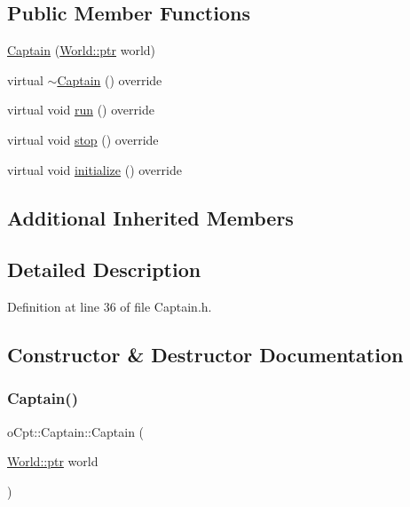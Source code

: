 \subsection*{Public Member Functions}
\begin{DoxyCompactItemize}
\item 
\hyperlink{classo_cpt_1_1_captain_a36f8b64ff252791b2d28bdb10a9652c7}{Captain} (\hyperlink{classo_cpt_1_1_world_aa6e591e3096d5de71e0cec9039663d67}{World\+::ptr} world)
\item 
virtual \hyperlink{classo_cpt_1_1_captain_ae78194ab847c6fbf3fae7f3d92f02f70}{$\sim$\+Captain} () override
\item 
virtual void \hyperlink{classo_cpt_1_1_captain_ade0ca7804340b555a9ead5dd01465045}{run} () override
\item 
virtual void \hyperlink{classo_cpt_1_1_captain_aa8a3923b961f4bc2ebc857895f759711}{stop} () override
\item 
virtual void \hyperlink{classo_cpt_1_1_captain_a3afce8b5a16b91a8b848ab6ae12a5ca6}{initialize} () override
\end{DoxyCompactItemize}
\subsection*{Additional Inherited Members}


\subsection{Detailed Description}


Definition at line 36 of file Captain.\+h.



\subsection{Constructor \& Destructor Documentation}
\hypertarget{classo_cpt_1_1_captain_a36f8b64ff252791b2d28bdb10a9652c7}{}\label{classo_cpt_1_1_captain_a36f8b64ff252791b2d28bdb10a9652c7} 
\subsubsection{\texorpdfstring{Captain()}{Captain()}}
{\footnotesize\ttfamily o\+Cpt\+::\+Captain\+::\+Captain (\begin{DoxyParamCaption}\item[{\hyperlink{classo_cpt_1_1_world_aa6e591e3096d5de71e0cec9039663d67}{World\+::ptr}}]{world }\end{DoxyParamCaption})}



